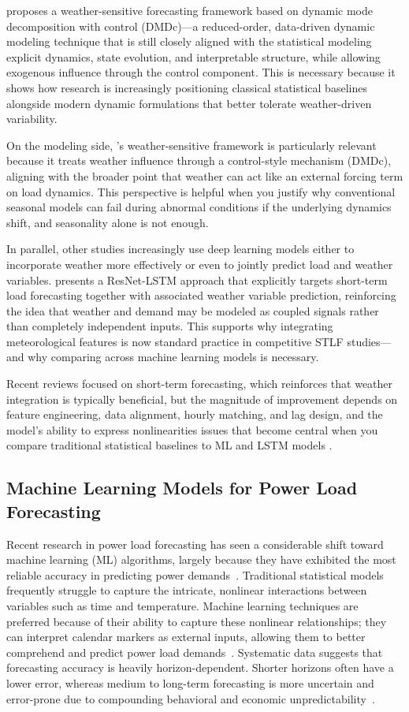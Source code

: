 \documentclass[conference]{IEEEtran}
\begin{document}
\cite{Mansouri} proposes a weather-sensitive forecasting framework based on dynamic mode decomposition with control (DMDc)—a reduced-order, data-driven dynamic modeling technique that is still closely aligned with the statistical modeling explicit dynamics, state evolution, and interpretable structure, while allowing exogenous influence through the control component. This is necessary because it shows how research is increasingly positioning classical statistical baselines alongside modern dynamic formulations that better tolerate weather-driven variability.

On the modeling side, \cite{Mansouri}'s weather-sensitive framework is particularly relevant because it treats weather influence through a control-style mechanism (DMDc), aligning with the broader point that weather can act like an external forcing term on load dynamics. This perspective is helpful when you justify why conventional seasonal models can fail during abnormal conditions if the underlying dynamics shift, and seasonality alone is not enough.

In parallel, other studies increasingly use deep learning models either to incorporate weather more effectively or even to jointly predict load and weather variables. \cite{Chen} presents a ResNet-LSTM approach that explicitly targets short-term load forecasting together with associated weather variable prediction, reinforcing the idea that weather and demand may be modeled as coupled signals rather than completely independent inputs. This supports why integrating meteorological features is now standard practice in competitive STLF studies—and why comparing across machine learning models is necessary.

Recent reviews focused on short-term forecasting, which reinforces that weather integration is typically beneficial, but the magnitude of improvement depends on feature engineering, data alignment, hourly matching, and lag design, and the model’s ability to express nonlinearities issues that become central when you compare traditional statistical baselines to ML and LSTM models \cite{Eren}.

\subsection{Machine Learning Models for Power Load Forecasting}

Recent research in power load forecasting has seen a considerable shift toward machine learning (ML) algorithms, largely because they have exhibited the most reliable accuracy in predicting power demands~\cite{oluajayi2022}. Traditional statistical models frequently struggle to capture the intricate, nonlinear interactions between variables such as time and temperature. Machine learning techniques are preferred because of their ability to capture these nonlinear relationships; they can interpret calendar markers as external inputs, allowing them to better comprehend and predict power load demands~\cite{vivas2020}. Systematic data suggests that forecasting accuracy is heavily horizon-dependent. Shorter horizons often have a lower error, whereas medium to long-term forecasting is more uncertain and error-prone due to compounding behavioral and economic unpredictability~\cite{hammad2020}.
\end{document}
